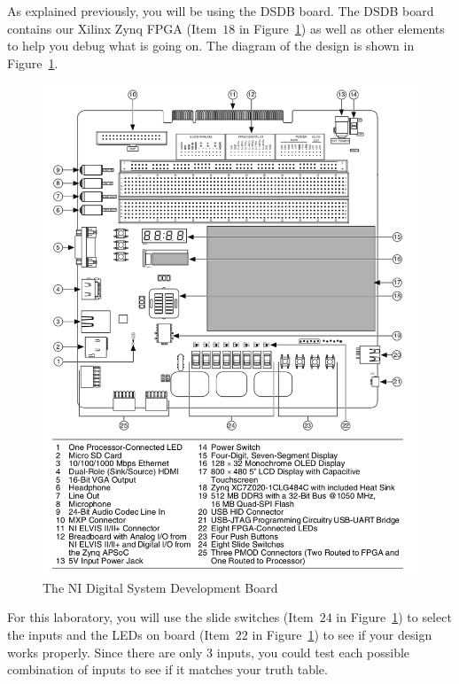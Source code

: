 \documentclass{article}
\begin{document}
As explained previously, you will be using the DSDB board.  The DSDB
board contains our Xilinx Zynq FPGA (Item~$18$ in Figure~\ref{dsdb1})
as well as other elements to help you
debug what is going on.  The diagram of the design is shown in
Figure~\ref{dsdb1}.
\begin{figure}
  \centering
  \includegraphics[scale=0.5]{dsdb1.png}
  \caption{The NI Digital System Development Board~\cite{dsdb1}}
  \label{dsdb1}
\end{figure}
For this laboratory, you will use the slide switches (Item~$24$ in
Figure~\ref{dsdb1}) to select the
inputs and the LEDs on board (Item~$22$ in Figure~\ref{dsdb1}) to see
if your design works properly.  Since there are only $3$ inputs, you
could test each possible combination of inputs to see if it matches
your truth table.
\end{document}
